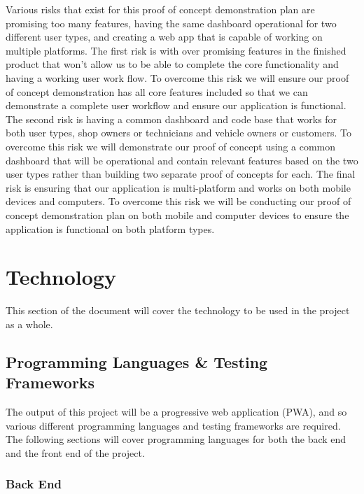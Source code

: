 \documentclass{article}
\begin{document}
Various risks that exist for this proof of concept demonstration plan are promising too many features, having the same dashboard operational for two different user types, and creating a web app that is capable of working on multiple platforms. The first risk is with over promising features in the finished product that won't allow us to be able to complete the core functionality and having a working user work flow. To overcome this risk we will ensure our proof of concept demonstration has all core features included so that we can demonstrate a complete user workflow and ensure our application is functional. The second risk is having a common dashboard and code base that works for both user types, shop owners or technicians and vehicle owners or customers. To overcome this risk we will demonstrate our proof of concept using a common dashboard that will be operational and contain relevant features based on the two user types rather than building two separate proof of concepts for each. The final risk is ensuring that our application is multi-platform and works on both mobile devices and computers. To overcome this risk we will be conducting our proof of concept demonstration plan on both mobile and computer devices to ensure the application is functional on both platform types.

\section{Technology}

This section of the document will cover the technology to be used in the project as a whole.

\subsection{Programming Languages \& Testing Frameworks}

The output of this project will be a progressive web application (PWA), and so various different programming languages and testing frameworks are required. The following sections will cover programming languages for both the back end and the front end of the project.

\subsubsection{Back End}
\end{document}
